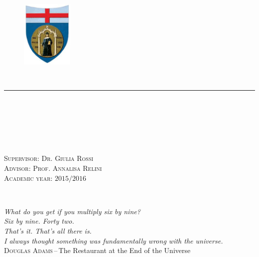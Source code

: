 \documentclass[a4paper,11pt,cleardoubleempty,bibliography=totoc]{scrbook}
\numberwithin{equation}{section}
\begin{document}
\frontmatter
\pagestyle{scrheadings}
\clearscrheadfoot
\rohead{\pagemark}
\lehead{\pagemark\qquad\leftmark}

%
\begin{titlepage}
\begin{center}
	\begin{figure}[h!t]
		\center
		\includegraphics[width=0.22\textwidth]{./unige.png}
	\end{figure}
	\\
	\noindent\rule{\textwidth}{0.5pt}\\
	\\
	~\\[3cm]
    \textcolor{BrickRed}{\large {}}
	~\\[3cm]
     \\
\end{center}
\vfill
\noindent
\textsc{\sffamily Supervisor: Dr. Giulia Rossi}%
~\\[0.3cm]
\textsc{\sffamily Advisor: Prof. Annalisa Relini}%
~\\[0.3cm]
\textsc{\sffamily Academic year: $2015/2016$}
\end{titlepage}
\restoregeometry

\cleardoublepage
~\\[3cm]
\begin{flushright}\footnotesize
	\textsl{What do you get if you multiply six by nine?}\\
	\textsl{Six by nine. Forty two.}\\
	\textsl{That's it. That's all there is.}\\
	\textsl{I always thought something was fundamentally wrong with the universe.}\\\medskip
	\textsc{\sffamily Douglas Adams}\,--\,\textsf{The Restaurant at the End of the Universe}
\end{flushright}
\vfill
\end{document}

